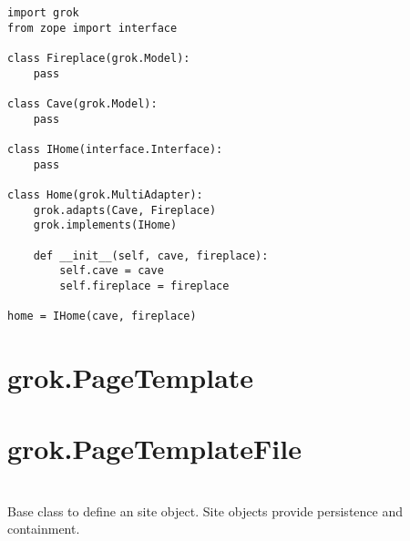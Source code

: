  \begin{verbatim}
import grok
from zope import interface

class Fireplace(grok.Model):
    pass

class Cave(grok.Model):
    pass

class IHome(interface.Interface):
    pass

class Home(grok.MultiAdapter):
    grok.adapts(Cave, Fireplace)
    grok.implements(IHome)

    def __init__(self, cave, fireplace):
        self.cave = cave
        self.fireplace = fireplace

home = IHome(cave, fireplace)
  \end{verbatim}

\section{grok.PageTemplate}

\section{grok.PageTemplateFile}

\section{}

  Base class to define an site object. Site objects provide persistence and
  containment.

\section{}

\section{}

\section{}
